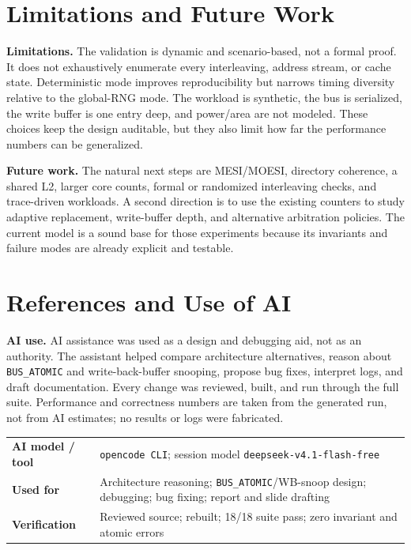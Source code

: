 \documentclass[11pt,a4paper]{article}
\newcommand{\code}[1]{\texttt{\small #1}}
\begin{document}
\section{Limitations and Future Work}
\textbf{Limitations.} The validation is dynamic and scenario-based, not a formal proof. It
does not exhaustively enumerate every interleaving, address stream, or cache state.
Deterministic mode improves reproducibility but narrows timing diversity relative to the
global-RNG mode. The workload is synthetic, the bus is serialized, the write buffer is
one entry deep, and power/area are not modeled. These choices keep the design auditable,
but they also limit how far the performance numbers can be generalized.

\textbf{Future work.} The natural next steps are MESI/MOESI, directory coherence, a shared
L2, larger core counts, formal or randomized interleaving checks, and trace-driven
workloads. A second direction is to use the existing counters to study adaptive
replacement, write-buffer depth, and alternative arbitration policies. The current model
is a sound base for those experiments because its invariants and failure modes are
already explicit and testable.

\section{References and Use of AI}
\textbf{AI use.} AI assistance was used as a design and debugging aid, not as an
authority. The assistant helped compare architecture alternatives, reason about
\code{BUS\_ATOMIC} and write-back-buffer snooping, propose bug fixes, interpret logs, and
draft documentation. Every change was reviewed, built, and run through the full suite.
Performance and correctness numbers are taken from the generated run, not from AI
estimates; no results or logs were fabricated.

\begin{center}
\small
\begin{tabularx}{\textwidth}{@{}p{}X@{}}
\toprule
\textbf{AI model / tool} & \code{opencode CLI}; session model \code{deepseek-v4.1-flash-free} \\
\textbf{Used for} & Architecture reasoning; \code{BUS\_ATOMIC}/WB-snoop design; debugging; bug fixing; report and slide drafting \\
\textbf{Verification} & Reviewed source; rebuilt; 18/18 suite pass; zero invariant and atomic errors \\
\bottomrule
\end{tabularx}
\end{center}
\end{document}
